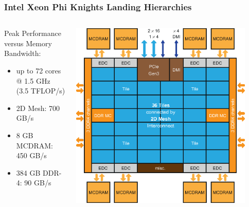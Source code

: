 \documentclass{beamer}
\begin{document}
  \begin{frame}
    \frametitle{Intel Xeon Phi Knights Landing Hierarchies}

    \begin{columns}[T]
      \begin{column}{.5\textwidth}
        \vspace{3mm}
        {
          \center Peak Performance versus
          Memory Bandwidth:
        }
        \vspace{3mm}
        \begin{itemize}
          \item up to 72 cores @ 1.5 GHz\\ (3.5 TFLOP/s)
          \item 2D Mesh: 700 GB/s
          \item 8 GB MCDRAM: 450 GB/s
          \item 384 GB DDR-4: 90 GB/s
        \end{itemize}
      \end{column}
      \begin{column}{.5\textwidth}
        \begin{center}
          \includegraphics[width=0.9\textwidth]{knl.eps}
        \end{center}
      \end{column}
    \end{columns}

  \end{frame}
\end{document}
